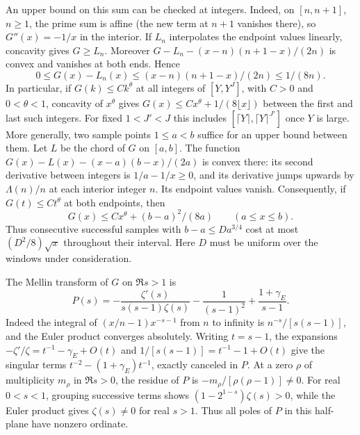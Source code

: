 \documentclass[10pt]{amsart}
\theoremstyle{definition}
\theoremstyle{remark}
\begin{document}
An upper bound on this sum can be checked at integers. Indeed, on
$[n,n+1]$, $n\ge1$, the prime sum is affine (the new term at
$n+1$ vanishes there), so $G''(x)=-1/x$ in the interior. If $L_n$
interpolates the endpoint values linearly, concavity gives
$G\ge L_n$. Moreover $G-L_n-(x-n)(n+1-x)/(2n)$ is convex and
vanishes at both ends. Hence
\[
 0\le G(x)-L_n(x)\le (x-n)(n+1-x)/(2n)\le 1/(8n).
\]
In particular, if $G(k)\le C k^\theta$ at all integers of
$[Y,Y^J]$, with $C>0$ and $0<\theta<1$, concavity of $x^\theta$
gives $G(x)\le Cx^\theta+1/(8\lfloor x\rfloor)$ between the first
and last such integers. For fixed $1<J'<J$ this includes
$[\lceil Y\rceil,\lceil Y\rceil^{J'}]$ once $Y$ is large.
More generally, two sample points $1\le a<b$ suffice for an
upper bound between them. Let $L$ be the chord of $G$ on $[a,b]$.
The function $G(x)-L(x)-(x-a)(b-x)/(2a)$ is convex there:
its second derivative between integers is $1/a-1/x\ge0$,
and its derivative jumps upwards by $\Lambda(n)/n$ at each
interior integer $n$. Its endpoint values vanish. Consequently,
if $G(t)\le Ct^\theta$ at both endpoints, then
\[
 G(x)\le Cx^\theta+(b-a)^2/(8a)\qquad(a\le x\le b).
\]
Thus consecutive successful samples with $b-a\le D a^{3/4}$
cost at most $(D^2/8)\sqrt{x}$ throughout their interval.
Here $D$ must be uniform over the windows under consideration.

The Mellin transform of $G$ on $\Re s>1$ is
\[
 P(s)=-\frac{\zeta'(s)}{s(s-1)\zeta(s)}
       -\frac1{(s-1)^2}+\frac{1+\gamma_E}{s-1}.
\]
Indeed the integral of $(x/n-1)x^{-s-1}$ from $n$ to infinity
is $n^{-s}/[s(s-1)]$, and the Euler product converges absolutely.
Writing $t=s-1$, the expansions $-\zeta'/\zeta=t^{-1}-\gamma_E+O(t)$
and $1/[s(s-1)]=t^{-1}-1+O(t)$ give the singular terms
$t^{-2}-(1+\gamma_E)t^{-1}$, exactly canceled in $P$.
At a zero $\rho$ of multiplicity $m_\rho$ in $\Re s>0$, the residue
of $P$ is $-m_\rho/[\rho(\rho-1)]\ne0$.
For real $0<s<1$, grouping successive terms shows
$(1-2^{1-s})\zeta(s)>0$, while the Euler product gives
$\zeta(s)\ne0$ for real $s>1$. Thus all poles of $P$ in this
half-plane have nonzero ordinate.
\end{document}
